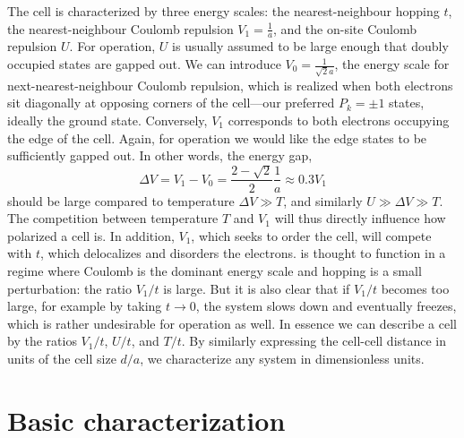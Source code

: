 The  cell is characterized by three energy scales: the
nearest-neighbour hopping $t$, the nearest-neighbour Coulomb repulsion $V_1 =
\frac{1}{a}$, and the on-site Coulomb repulsion $U$. For  operation,
$U$ is usually assumed to be large enough that doubly occupied states are gapped
out. We can introduce $V_0 = \frac{1}{\sqrt{2} a}$, the energy scale for
next-nearest-neighbour Coulomb repulsion, which is realized when both electrons
sit diagonally at opposing corners of the cell---our preferred $P_k=\pm1$
states, ideally the ground state. Conversely, $V_1$ corresponds to both
electrons occupying the edge of the cell. Again, for  operation we
would like the edge states to be sufficiently gapped out. In other words, the
energy gap, 
\begin{equation}
  \label{eq:deltaV}
  \Delta V = V_1 - V_0 = \frac{2 - \sqrt{2}}{2} \frac{1}{a} \approx 0.3 V_1
\end{equation}
should be large compared to temperature $\Delta V \gg T$, and similarly $U \gg
\Delta V \gg T$. The competition between temperature $T$ and $V_1$ will thus
directly influence how polarized a cell is. In addition, $V_1$, which seeks to
order the cell, will compete with $t$, which delocalizes and disorders the
electrons.  is thought to function in a regime where Coulomb is the
dominant energy scale and hopping is a small perturbation: the ratio $V_1/t$ is
large. But it is also clear that if $V_1/t$ becomes too large, for example by
taking $t \rightarrow 0$, the system slows down and eventually freezes, which is
rather undesirable for  operation as well. In essence we can describe
a cell by the ratios $V_1/t$, $U/t$, and $T/t$. By similarly expressing the
cell-cell distance in units of the cell size $d/a$, we characterize any
 system in dimensionless units.


\section{Basic characterization}
\label{sec:basic_characterization}


